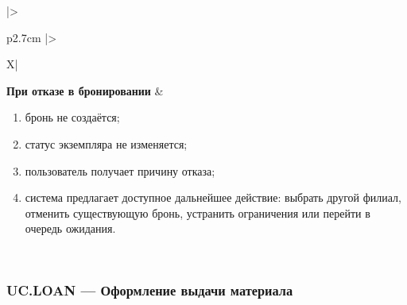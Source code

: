 \documentclass[12pt,a4paper]{article}
\begin{document}
\begin{xltabular}{\textwidth}{
				|>{\raggedright\arraybackslash}p{2.7cm}
				|>{\raggedright\arraybackslash}X|
			}
			\textbf{При отказе в бронировании} &
			\begin{enumerate}
				\item бронь не создаётся;
				\item статус экземпляра не изменяется;
				\item пользователь получает причину отказа;
				\item система предлагает доступное дальнейшее действие: выбрать
				другой филиал, отменить существующую бронь, устранить ограничения
				или перейти в очередь ожидания.
			\end{enumerate} \\
			\hline
			
		\end{xltabular}
		
		\label{tab:uc-reservation-specification}
		
		\clearpage
		\subsubsection{UC.LOAN --- Оформление выдачи материала}
		
\end{document}
